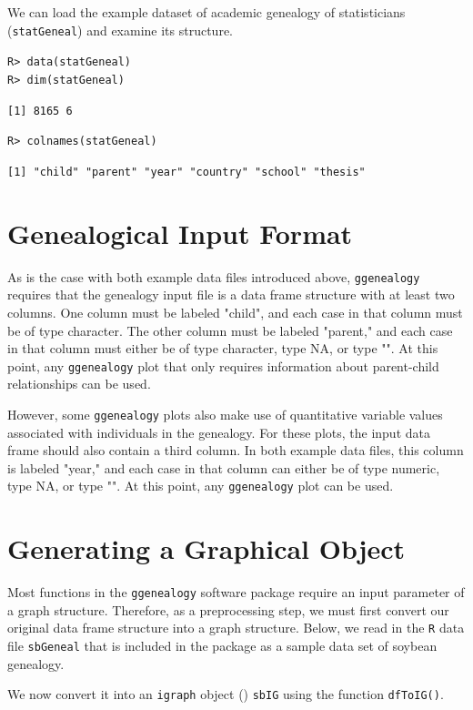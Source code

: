 \documentclass[11pt,a4paper,oldfontcommands,openany]{memoir}
\DeclareRobustCommand{\mybox}[2][gray!15]{%
\begin{tcolorbox}[   %
        breakable,
        left=0pt,
        right=0pt,
        top=0pt,
        bottom=0pt,
        colback=#1,
        colframe=#1,
        width=\dimexpr\textwidth\relax, 
        enlarge left by=0mm,
        boxsep=5pt,
        arc=0pt,outer arc=0pt,
        ]
        #2
\end{tcolorbox}
}
\numberwithin{equation}{section} %
\newcommand{\code}[1]{{\texttt{#1}}}
\newcommand{\pkg}[1]{{\texttt{#1}}}
\begin{document}
We can load the example dataset of academic genealogy of statisticians (\code{statGeneal}) and examine its structure. 

\mybox{
\texttt{R> data(statGeneal)}\\
\texttt{R> dim(statGeneal)}
}

\mybox[green!10]{
\texttt{[1] 8165    6}
}

\mybox{
\texttt{R> colnames(statGeneal)}
}

\mybox[green!10]{
\texttt{[1] "child"   "parent"  "year"    "country" "school"  "thesis"}
}

\section{Genealogical Input Format}

As is the case with both example data files introduced above, \pkg{ggenealogy} requires that the genealogy input file is a data frame structure with at least two columns. One column must be labeled "child", and each case in that column must be of type character. The other column must be labeled "parent," and each case in that column must either be of type character, type NA, or type "". At this point, any \pkg{ggenealogy} plot that only requires information about parent-child relationships can be used.

However, some \pkg{ggenealogy} plots also make use of quantitative variable values associated with individuals in the genealogy. For these plots, the input data frame should also contain a third column. In both example data files, this column is labeled "year," and each case in that column can either be of type numeric, type NA, or type "". At this point, any \pkg{ggenealogy} plot can be used.

\section{Generating a Graphical Object}

Most functions in the \pkg{ggenealogy} software package require an input parameter of a graph structure. Therefore, as a preprocessing step, we must first convert our original data frame structure into a graph structure. Below, we read in the \pkg{R} data file \code{sbGeneal} that is included in the package as a sample data set of soybean genealogy.

We now convert it into an \pkg{igraph} object (\citealt{igraph}) \code{sbIG} using the function \code{dfToIG()}.
\end{document}
